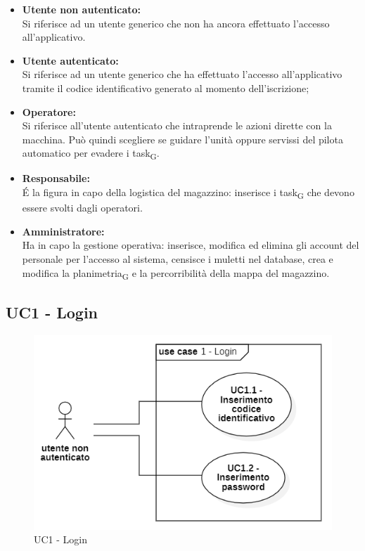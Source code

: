 \begin{itemize}
	\item{\textbf{Utente non autenticato:}\\
	Si riferisce ad un utente generico che non ha ancora effettuato l'accesso all'applicativo.}
	\item{\textbf{Utente autenticato:}\\
	Si riferisce ad un utente generico che ha effettuato l'accesso all'applicativo tramite il codice identificativo generato al momento dell'iscrizione;}
	\item{\textbf{Operatore:}\\
	Si riferisce all'utente autenticato che intraprende le azioni dirette con la macchina. Può quindi scegliere se guidare l'unità oppure servissi del pilota automatico per evadere i task\textsubscript{G}.}
	\item{\textbf{Responsabile:}\\
	 \'E la figura in capo della logistica del magazzino: inserisce i task\textsubscript{G} che devono essere svolti dagli operatori.}
	\item{\textbf{Amministratore:}\\
 Ha in capo la gestione operativa: inserisce, modifica ed elimina gli account del personale per l'accesso al sistema, censisce i muletti nel database, crea e modifica la planimetria\textsubscript{G} e la percorribilità della mappa del magazzino.}
\end{itemize}

\subsection{UC1 - Login}
\begin{figure}[H]
	\centering
	\includegraphics[scale=0.52]{res/images/uc1.PNG}
	\caption{UC1 - Login}
\end{figure}


